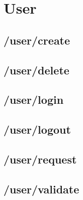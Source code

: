 \section{User}
\subsection{/user/create}

\subsection{/user/delete}


\subsection{/user/login}
\label{appauth}

\subsection{/user/logout}

\subsection{/user/request}

\subsection{/user/validate}